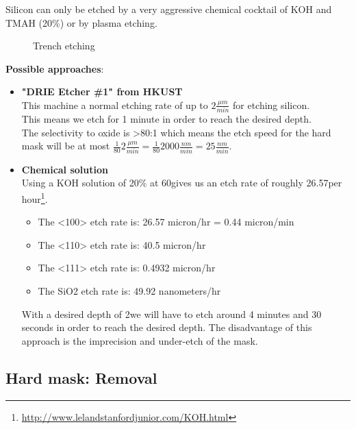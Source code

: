 Silicon can only be etched by a very aggressive chemical cocktail of  KOH and TMAH (20\%) or by plasma etching.

\begin{figure}[H]
	\centering
	\begin{tikzpicture}[node distance = 3cm, auto, thick,scale=\CrossSectionOnly, every node/.style={transform shape}]
		
	\end{tikzpicture}
	\drawStepArrow{}
	\begin{tikzpicture}[node distance = 3cm, auto, thick,scale=\CrossSectionOnly, every node/.style={transform shape}]
		
	\end{tikzpicture}
	\caption{Trench etching}
\end{figure}

\textbf{Possible approaches}:
\begin{itemize}
\item \textbf{"DRIE Etcher \#1" from HKUST} \\
This machine a normal etching rate of up to $2\frac{\mu m}{min}$ for etching silicon. \\
This means we etch for 1 minute in order to reach the desired depth. \\
The selectivity to oxide is >80:1 which means the etch speed for the hard mask will be at most $\frac{1}{80}2\frac{\mu m}{min}=\frac{1}{80}2000\frac{nm}{min}=25\frac{nm}{min}$.
\item \textbf{Chemical solution} \\
Using a KOH solution of 20\% at 60\degreesC gives us an etch rate of roughly  26.57\um per hour\footnote{\url{http://www.lelandstanfordjunior.com/KOH.html}}.
\begin{itemize}
\item The <100> etch rate is: 26.57 micron/hr = 0.44 micron/min
\item The <110> etch rate is: 40.5 micron/hr 
\item The <111> etch rate is: 0.4932 micron/hr 
\item The SiO2 etch rate is: 49.92 nanometers/hr 
\end{itemize}
With a desired depth of 2\um we will have to etch around 4 minutes and 30 seconds in order to reach the desired depth.
The disadvantage of this approach is the imprecision and under-etch of the mask.
\end{itemize}

\subsection{Hard mask: Removal}

